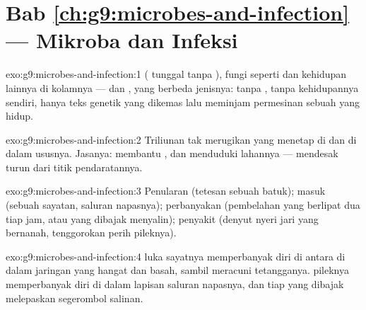 \section*{Bab \ref{ch:g9:microbes-and-infection} --- Mikroba dan Infeksi}

\begin{solution}{exo:g9:microbes-and-infection:1}
 ( tunggal tanpa ), fungi 
seperti  dan kehidupan  lainnya di
kolamnya --- dan , yang berbeda jenisnya: tanpa ,
tanpa kehidupannya sendiri, hanya teks genetik yang dikemas
lalu meminjam permesinan sebuah  yang hidup.
\end{solution}

\begin{solution}{exo:g9:microbes-and-infection:2}
Triliunan  tak merugikan yang menetap di  dan di
dalam ususnya. Jasanya: membantu , dan
menduduki lahannya --- mendesak  turun dari titik
pendaratannya.
\end{solution}

\begin{solution}{exo:g9:microbes-and-infection:3}
Penularan (tetesan sebuah batuk); masuk (sebuah sayatan,
saluran napasnya); perbanyakan (pembelahan yang berlipat dua
tiap jam, atau  yang dibajak menyalin); penyakit (denyut
nyeri jari yang bernanah, tenggorokan perih pileknya).
\end{solution}

\begin{solution}{exo:g9:microbes-and-infection:4}
 luka sayatnya memperbanyak diri di antara  di
dalam jaringan yang hangat dan basah, sambil meracuni
tetangganya.  pileknya memperbanyak diri di dalam 
lapisan saluran napasnya, dan tiap  yang dibajak
melepaskan segerombol salinan.
\end{solution}

